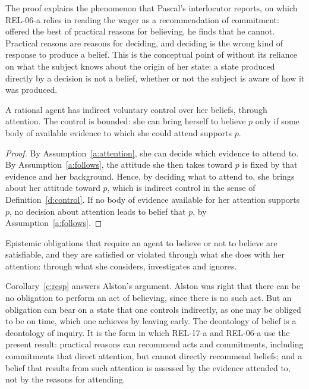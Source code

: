 \documentclass{situationist-preprint}
\begin{document}
The proof explains the phenomenon that Pascal's interlocutor reports, on which REL-06-a relies in reading the wager as a recommendation of commitment: offered the best of practical reasons for believing, he finds that he cannot. Practical reasons are reasons for deciding, and deciding is the wrong kind of response to produce a belief. This is the conceptual point of \citet{Williams1973} without its reliance on what the subject knows about the origin of her state: a state produced directly by a decision is not a belief, whether or not the subject is aware of how it was produced.

\begin{theorem}\label{t:indirect}
A rational agent has indirect voluntary control over her beliefs, through attention. The control is bounded: she can bring herself to believe $p$ only if some body of available evidence to which she could attend supports $p$.
\end{theorem}

\begin{proof}
By Assumption~\ref{a:attention}, she can decide which evidence to attend to. By Assumption~\ref{a:follows}, the attitude she then takes toward $p$ is fixed by that evidence and her background. Hence, by deciding what to attend to, she brings about her attitude toward $p$, which is indirect control in the sense of Definition~\ref{d:control}. If no body of evidence available for her attention supports $p$, no decision about attention leads to belief that $p$, by Assumption~\ref{a:follows}.
\end{proof}

\begin{corollary}[Responsibility]\label{c:resp}
Epistemic obligations that require an agent to believe or not to believe are satisfiable, and they are satisfied or violated through what she does with her attention: through what she considers, investigates and ignores.
\end{corollary}

Corollary~\ref{c:resp} answers Alston's argument. Alston was right that there can be no obligation to perform an act of believing, since there is no such act. But an obligation can bear on a state that one controls indirectly, as one may be obliged to be on time, which one achieves by leaving early. The deontology of belief is a deontology of inquiry. It is the form in which REL-17-a and REL-06-a use the present result: practical reasons can recommend acts and commitments, including commitments that direct attention, but cannot directly recommend beliefs; and a belief that results from such attention is assessed by the evidence attended to, not by the reasons for attending.
\end{document}
